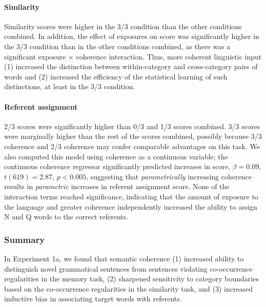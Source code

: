 \documentclass[man,floatsintext]{apa6}
\begin{document}
\paragraph{Similarity} Similarity scores were higher in the 3/3 condition than the other conditions combined. In addition, the effect of exposures on score was significantly higher in the 3/3 condition than in the other conditions combined, as there was a significant exposure $\times$ coherence interaction. Thus, more coherent linguistic input (1) increased the distinction between within-category and cross-category pairs of words and (2) increased the efficiency of the statistical learning of such distinctions, at least in the 3/3 condition.

\paragraph{Referent assignment}

2/3 scores were significantly higher than 0/3 and 1/3 scores combined. 3/3 scores were marginally higher than the rest of the scores combined, possibly because 3/3 coherence and 2/3 coherence may confer comparable advantages on this task. We also computed this model using coherence as a continuous variable; the continuous coherence regressor significantly predicted increases in score, $\beta = 0.09$, $t(619) = 2.87$, $p < 0.005$, suggesting that \emph{parametrically} increasing coherence results in \emph{parametric} increases in referent assignment score. None of the interaction terms reached significance, indicating that the amount of exposure to the language and greater coherence independently increased the ability to assign N and Q words to the correct referents.


\subsubsection{Summary}

In Experiment 1a, we found that semantic coherence (1) increased ability to distinguish novel grammatical sentences from sentences violating co-occurrence regularities in the memory task, (2) sharpened sensitivity to category boundaries based on the co-occurrence regularities in the similarity task, and (3) increased inductive bias in associating target words with referents.
\end{document}
